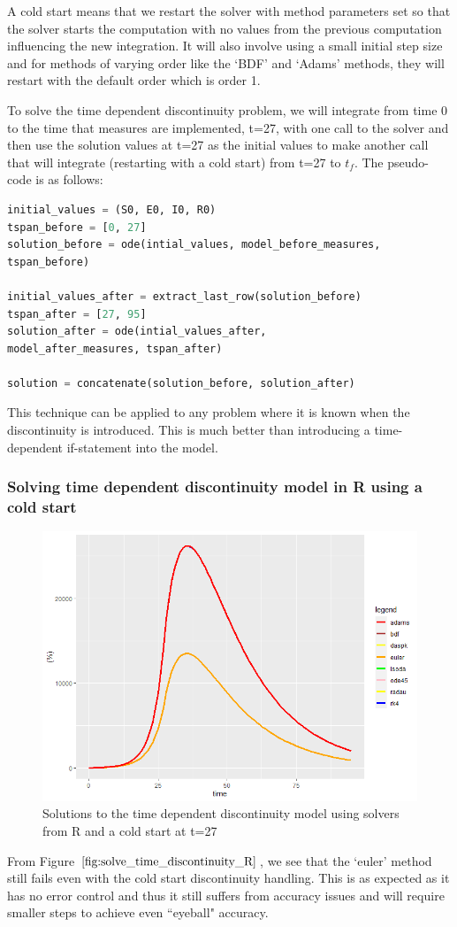 A cold start means that we restart the solver with method parameters set so that the solver starts the computation with no values from the previous computation influencing the new integration. It will also involve using a small initial step size and for methods of varying order like the `BDF' and `Adams' methods, they will restart with the default order which is order 1.

To solve the time dependent discontinuity problem, we will integrate from time 0 to the time that measures are implemented, t=27, with one call to the solver and then use the solution values at t=27 as the initial values to make another call that will integrate (restarting with a cold start) from t=27 to $t_f$. The pseudo-code is as follows:

\begin{minipage}{\linewidth}
\begin{lstlisting}[language=Python]
initial_values = (S0, E0, I0, R0)
tspan_before = [0, 27]
solution_before = ode(intial_values, model_before_measures,
tspan_before)

initial_values_after = extract_last_row(solution_before)
tspan_after = [27, 95]
solution_after = ode(intial_values_after, 
model_after_measures, tspan_after)

solution = concatenate(solution_before, solution_after)
\end{lstlisting}
\end{minipage}

This technique can be applied to any problem where it is known when the discontinuity is introduced. This is much better than introducing a time-dependent if-statement into the model.

\subsubsection{Solving time dependent discontinuity model in R using a cold start} 
\begin{figure}[H]
\centering
\includegraphics[width=0.7\linewidth]{./figures/solve_time_discontinuity_R}
\caption{Solutions to the time dependent discontinuity model using solvers from R and a cold start at t=27}
\label{fig:solve_time_discontinuity_R}
\end{figure}
From Figure $\ref{fig:solve_time_discontinuity_R}$, we see that the `euler' method still fails even with the cold start discontinuity handling. This is as expected as it has no error control and thus it still suffers from accuracy issues and will require smaller steps to achieve even ``eyeball" accuracy.

